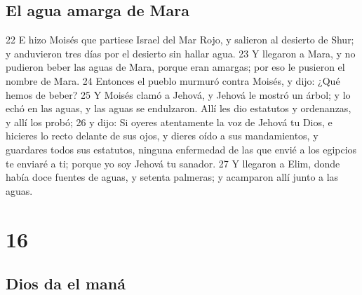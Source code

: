 \section*{El agua amarga de Mara}

22 E hizo Moisés que partiese Israel del Mar Rojo, y salieron al desierto de Shur; y anduvieron tres días por el desierto sin hallar agua.
23 Y llegaron a Mara, y no pudieron beber las aguas de Mara, porque eran amargas; por eso le pusieron el nombre de Mara.
24 Entonces el pueblo murmuró contra Moisés, y dijo: ¿Qué hemos de beber?
25 Y Moisés clamó a Jehová, y Jehová le mostró un árbol; y lo echó en las aguas, y las aguas se endulzaron. Allí les dio estatutos y ordenanzas, y allí los probó;
26 y dijo: Si oyeres atentamente la voz de Jehová tu Dios, e hicieres lo recto delante de sus ojos, y dieres oído a sus mandamientos, y guardares todos sus estatutos, ninguna enfermedad de las que envié a los egipcios te enviaré a ti; porque yo soy Jehová tu sanador.
27 Y llegaron a Elim, donde había doce fuentes de aguas, y setenta palmeras; y acamparon allí junto a las aguas.

\chapter{16}

\section*{Dios da el maná}

